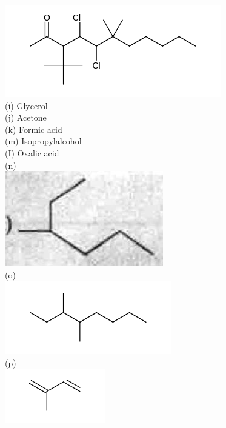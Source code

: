 \documentclass[10pt]{article}
\begin{document}
\includegraphics{smile-004a665c307eed4cc230092cb8cd18ea7908a407}\\
(i) Glycerol\\
(j) Acetone\\
(k) Formic acid\\
(m) Isopropylalcohol\\
(I) Oxalic acid\\
(n)\\
\includegraphics[max width=\textwidth, center]{2025_01_28_8470952b98110cec3aabg-037(2)}\\
(o)\\
\includegraphics{smile-95ec4dafc0f6f90205b3b5f9fc2b72aa6bd7df0f}\\
(p)\\
\includegraphics{smile-0ae40374c7ce62d2f7b80819f28a411f681b3ddb}\\
\end{document}
